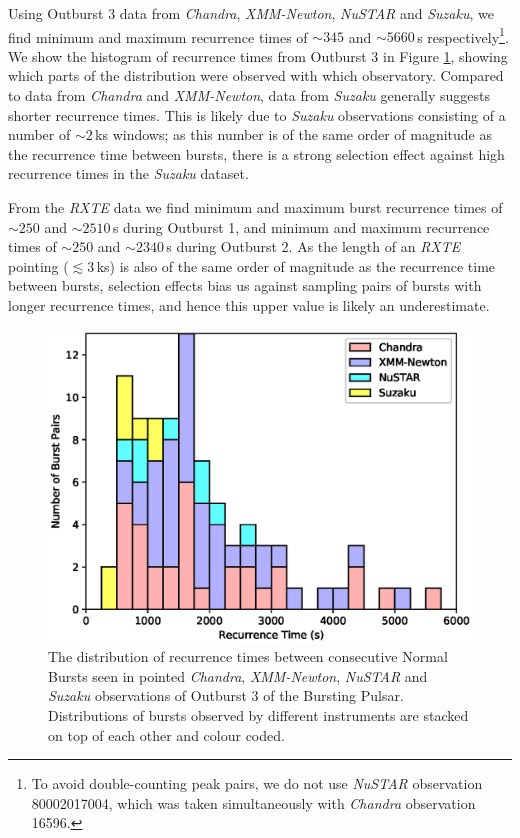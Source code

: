\par Using Outburst 3 data from \textit{Chandra}, \textit{XMM-Newton}, \textit{NuSTAR} and \textit{Suzaku}, we find minimum and maximum recurrence times of $\sim345$ and $\sim5660$\,s respectively\footnote{To avoid double-counting peak pairs, we do not use \textit{NuSTAR} observation 80002017004, which was taken simultaneously with \textit{Chandra} observation 16596.}.  We show the histogram of recurrence times from Outburst 3 in Figure \ref{fig:sep}, showing which parts of the distribution were observed with which observatory.  Compared to data from \textit{Chandra} and \textit{XMM-Newton}, data from \textit{Suzaku} generally suggests shorter recurrence times.  This is likely due to \textit{Suzaku} observations consisting of a number of $\sim2$\,ks windows; as this number is of the same order of magnitude as the recurrence time between bursts, there is a strong selection effect against high recurrence times in the \textit{Suzaku} dataset.
\par From the \textit{RXTE} data we find minimum and maximum burst recurrence times of $\sim250$ and $\sim2510$\,s during Outburst 1, and minimum and maximum recurrence times of $\sim250$ and $\sim2340$\,s during Outburst 2.  As the length of an \textit{RXTE} pointing ($\lesssim3$\,ks) is also of the same order of magnitude as the recurrence time between bursts, selection effects bias us against sampling pairs of bursts with longer recurrence times, and hence this upper value is likely an underestimate.

\begin{figure}
  \centering
  \includegraphics[width=.9\linewidth, trim={0.4cm 0 1.1cm 0},clip]{images/manyinst_stdist.eps}
  \caption[The distribution of recurrence times between consecutive Normal Bursts in Outburst 3.]{\small The distribution of recurrence times between consecutive Normal Bursts seen in pointed \textit{Chandra}, \textit{XMM-Newton}, \textit{NuSTAR} and \textit{Suzaku} observations of Outburst 3 of the Bursting Pulsar.  Distributions of bursts observed by different instruments are stacked on top of each other and colour coded.}
  \label{fig:sep}
\end{figure}

